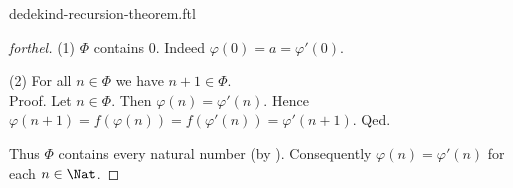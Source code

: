 \documentclass{naproche-library}
\begin{document}
\begin{smodule}{dedekind-recursion-theorem.ftl}
\begin{proof}[forthel]
    (1) $\Phi$ contains $0$.
    Indeed $\varphi(0) = a = \varphi'(0)$.

    (2) For all $n \in \Phi$ we have $n + 1 \in \Phi$. \\
    Proof.
      Let $n \in \Phi$.
      Then $\varphi(n) = \varphi'(n)$.
      Hence $\varphi(n + 1)
        = f(\varphi(n))
        = f(\varphi'(n))
        = \varphi'(n + 1)$.
    Qed.

    Thus $\Phi$ contains every natural number (by ).
    Consequently $\varphi(n) = \varphi'(n)$ for each $n \in \Nat$.
  \end{proof}
\end{smodule}
\end{document}
